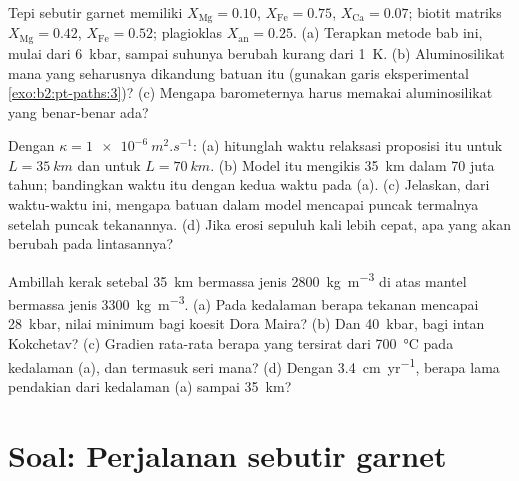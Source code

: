 \begin{exercise}[$\star\star\star$]\label{exo:b2:pt-paths:10}
Tepi sebutir garnet memiliki $X_{\text{Mg}} = 0.10$, $X_{\text{Fe}} = 0.75$, $X_{\text{Ca}} = 0.07$;
biotit matriks $X_{\text{Mg}} = 0.42$, $X_{\text{Fe}} = 0.52$; plagioklas
$X_{\text{an}} = 0.25$. (a) Terapkan metode bab ini, mulai dari \qty{6}{kbar},
sampai suhunya berubah kurang dari \qty{1}{K}. (b) Aluminosilikat mana yang seharusnya dikandung
batuan itu (gunakan garis eksperimental \cref{exo:b2:pt-paths:3})? (c) Mengapa barometernya harus memakai
aluminosilikat yang benar-benar ada?
\end{exercise}

\begin{exercise}[$\star\star\star$]\label{exo:b2:pt-paths:11}
Dengan $\kappa = \qty{1e-6}{m^2.s^{-1}}$: (a) hitunglah waktu relaksasi
proposisi itu untuk $L = \qty{35}{km}$ dan untuk $L = \qty{70}{km}$. (b) Model itu mengikis
\qty{35}{km} dalam 70 juta tahun; bandingkan waktu itu dengan kedua waktu pada (a). (c) Jelaskan,
dari waktu-waktu ini, mengapa batuan dalam model mencapai puncak termalnya setelah puncak
tekanannya. (d) Jika erosi sepuluh kali lebih cepat, apa yang akan berubah pada lintasannya?
\end{exercise}

\begin{exercise}[$\star\star\star$]\label{exo:b2:pt-paths:12}
Ambillah kerak setebal \qty{35}{km} bermassa jenis \qty{2800}{kg.m^{-3}} di atas mantel bermassa jenis
\qty{3300}{kg.m^{-3}}. (a) Pada kedalaman berapa tekanan mencapai \qty{28}{kbar}, nilai
minimum bagi koesit Dora Maira? (b) Dan \qty{40}{kbar}, bagi intan Kokchetav?
(c) Gradien rata-rata berapa yang tersirat dari \qty{700}{\celsius} pada kedalaman (a), dan termasuk seri
mana? (d) Dengan \qty{3.4}{cm.yr^{-1}}, berapa lama pendakian dari kedalaman
(a) sampai \qty{35}{km}?
\end{exercise}

\section{Soal: Perjalanan sebutir garnet}

